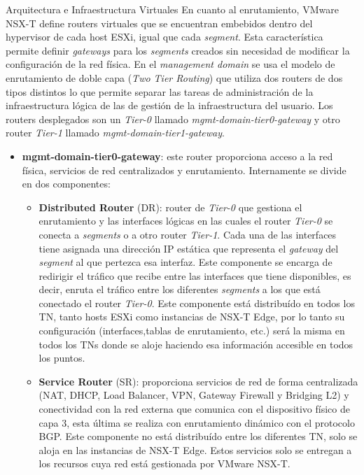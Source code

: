 \begin{subsection}{Arquitectura e Infraestructura Virtuales\cite{CFVirtInfraes}}
En cuanto al enrutamiento, VMware NSX-T define routers virtuales que se encuentran embebidos dentro del hypervisor de cada host ESXi, igual que cada \textit{segment}. Esta característica permite definir \textit{gateways} para los \textit{segments} creados sin necesidad de modificar la configuración de la red física. En el \textit{management domain} se usa el modelo de enrutamiento de doble capa (\textit{Two Tier Routing}) que utiliza dos routers de dos tipos distintos lo que permite separar las tareas de administración de la infraestructura lógica de las de gestión de la infraestructura del usuario. Los routers desplegados son un \textit{Tier-0} llamado \textit{mgmt-domain-tier0-gateway} y otro router \textit{Tier-1} llamado \textit{mgmt-domain-tier1-gateway}.
\begin{itemize}
  \item \textbf{mgmt-domain-tier0-gateway}: este router proporciona acceso a la red física, servicios de red centralizados y enrutamiento. Internamente se divide en dos componentes:
    \begin{itemize}
      
      \item \textbf{Distributed Router} (DR): router de \textit{Tier-0} que gestiona el enrutamiento y las interfaces lógicas en las cuales el router \textit{Tier-0} se conecta a \textit{segments} o a otro router \textit{Tier-1}. Cada una de las interfaces tiene asignada una dirección IP estática que representa el \textit{gateway} del \textit{segment} al que pertezca esa interfaz. Este componente se encarga de redirigir el tráfico que recibe entre las interfaces que tiene disponibles, es decir, enruta el tráfico entre los diferentes \textit{segments} a los que está conectado el router \textit{Tier-0}. Este componente está distribuído en todos los TN, tanto hosts ESXi como instancias de NSX-T Edge, por lo tanto su configuración (interfaces,tablas de enrutamiento, etc.) será la misma en todos los TNs donde se aloje haciendo esa información accesible en todos los puntos.
      
      \item \textbf{Service Router} (SR): proporciona servicios de red de forma centralizada (NAT, DHCP, Load Balancer, VPN, Gateway Firewall y Bridging L2) y conectividad con la red externa que comunica con el dispositivo físico de capa 3, esta última se realiza con enrutamiento dinámico con el protocolo BGP. Este componente no está distribuído entre los diferentes TN, solo se aloja en las instancias de NSX-T Edge. Estos servicios solo se entregan a los recursos cuya red está gestionada por VMware NSX-T.
      

\end{itemize}
\end{itemize}
\end{subsection}
